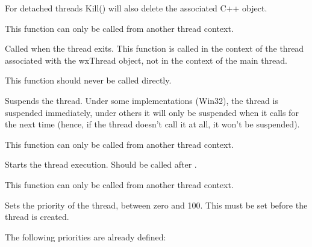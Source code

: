 For detached threads Kill() will also delete the associated C++ object.

This function can only be called from another thread context.

\label{wxthreadonexit}


Called when the thread exits. This function is called in the context of the thread
associated with the wxThread object, not in the context of the main thread.

This function should never be called directly.

\label{wxthreadpause}


Suspends the thread. Under some implementations (Win32), the thread is
suspended immediately, under others it will only be suspended when it calls 
 for the next time (hence, if the
thread doesn't call it at all, it won't be suspended).

This function can only be called from another thread context.

\label{wxthreadrun}


Starts the thread execution. Should be called after 
.

This function can only be called from another thread context.

\label{wxthreadsetpriority}


Sets the priority of the thread, between zero and 100. This must be set before the thread is created.

The following priorities are already defined:

\twocolwidtha{7cm}
\begin{twocollist}\itemsep=0pt
\end{twocollist}

\label{wxthreadsleep}


